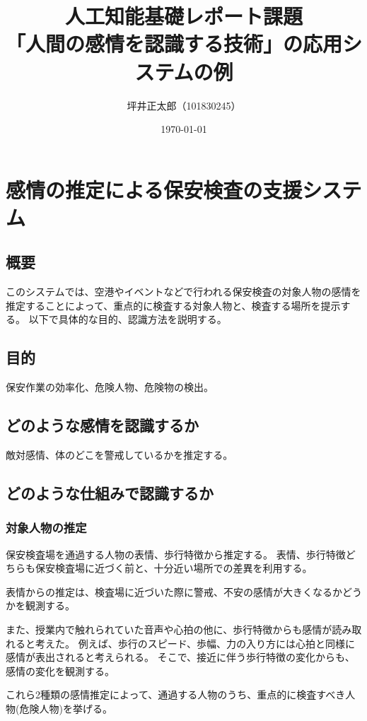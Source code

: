 \documentclass[a4paper,10pt]{jsarticle}
\begin{document}
\title{人工知能基礎レポート課題\\「人間の感情を認識する技術」の応用システムの例}
\author{坪井正太郎（101830245）}
\date{\today}
\maketitle

\section{感情の推定による保安検査の支援システム}
\subsection{概要}
このシステムでは、空港やイベントなどで行われる保安検査の対象人物の感情を推定することによって、重点的に検査する対象人物と、検査する場所を提示する。
以下で具体的な目的、認識方法を説明する。

\subsection{目的}
保安作業の効率化、危険人物、危険物の検出。

\subsection{どのような感情を認識するか}
敵対感情、体のどこを警戒しているかを推定する。

\subsection{どのような仕組みで認識するか}
\subsubsection{対象人物の推定}
保安検査場を通過する人物の表情、歩行特徴から推定する。
表情、歩行特徴どちらも保安検査場に近づく前と、十分近い場所での差異を利用する。

表情からの推定は、検査場に近づいた際に警戒、不安の感情が大きくなるかどうかを観測する。

また、授業内で触れられていた音声や心拍の他に、歩行特徴からも感情が読み取れると考えた。
例えば、歩行のスピード、歩幅、力の入り方には心拍と同様に感情が表出されると考えられる。
そこで、接近に伴う歩行特徴の変化からも、感情の変化を観測する。

これら2種類の感情推定によって、通過する人物のうち、重点的に検査すべき人物(危険人物)を挙げる。
\end{document}
